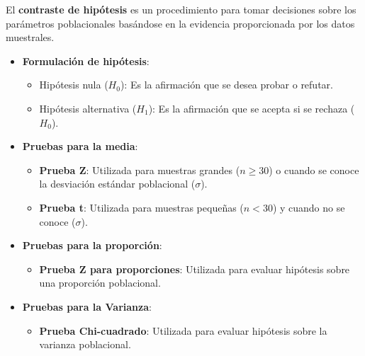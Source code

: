 \documentclass[
  letterpaper,
  DIV=11,
  numbers=noendperiod]{scrreprt}
\providecommand{\tightlist}{%
  \setlength{\itemsep}{0pt}\setlength{\parskip}{0pt}}\usepackage{longtable,booktabs,array}
\begin{document}
\begin{tcolorbox}[enhanced jigsaw, arc=.35mm, breakable, coltitle=black, left=2mm, opacityback=0, bottomtitle=1mm, colbacktitle=quarto-callout-note-color!10!white, title=\textcolor{quarto-callout-note-color}{\faInfo}\hspace{0.5em}{Contraste de hipótesis}, titlerule=0mm, colback=white, colframe=quarto-callout-note-color-frame, bottomrule=.15mm, rightrule=.15mm, opacitybacktitle=0.6, toptitle=1mm, toprule=.15mm, leftrule=.75mm]

El \textbf{contraste de hipótesis} es un procedimiento para tomar
decisiones sobre los parámetros poblacionales basándose en la evidencia
proporcionada por los datos muestrales.

\begin{itemize}
\item
  \textbf{Formulación de hipótesis}:

  \begin{itemize}
  \item
    Hipótesis nula (\(H_0\)): Es la afirmación que se desea probar o
    refutar.
  \item
    Hipótesis alternativa (\(H_1\)): Es la afirmación que se acepta si
    se rechaza (\(H_0\)).
  \end{itemize}
\item
  \textbf{Pruebas para la media}:

  \begin{itemize}
  \item
    \textbf{Prueba Z}: Utilizada para muestras grandes (\(n \ge 30\)) o
    cuando se conoce la desviación estándar poblacional (\(\sigma\)).
  \item
    \textbf{Prueba t}: Utilizada para muestras pequeñas (\(n < 30\)) y
    cuando no se conoce (\(\sigma\)).
  \end{itemize}
\item
  \textbf{Pruebas para la proporción}:

  \begin{itemize}
  \tightlist
  \item
    \textbf{Prueba Z para proporciones}: Utilizada para evaluar
    hipótesis sobre una proporción poblacional.
  \end{itemize}
\item
  \textbf{Pruebas para la Varianza}:

  \begin{itemize}
  \tightlist
  \item
    \textbf{Prueba Chi-cuadrado}: Utilizada para evaluar hipótesis sobre
    la varianza poblacional.
  \end{itemize}
\end{itemize}

\end{tcolorbox}
\end{document}
